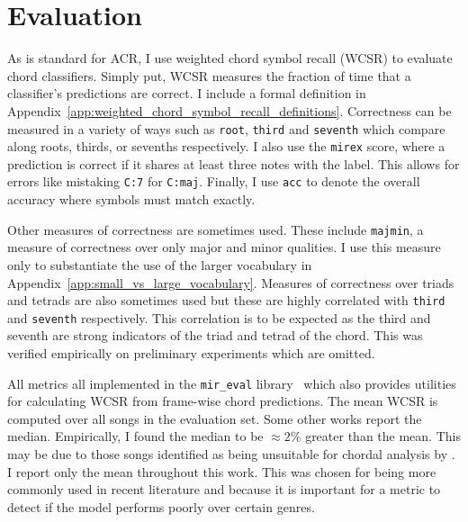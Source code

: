 


\section{Evaluation}\label{sec:evaluation}

As is standard for ACR, I use weighted chord symbol recall (WCSR) to evaluate chord classifiers. Simply put, WCSR measures the fraction of time that a classifier's predictions are correct. I include a formal definition in Appendix~\ref{app:weighted_chord_symbol_recall_definitions}. Correctness can be measured in a variety of ways such as \texttt{root}, \texttt{third} and \texttt{seventh} which compare along roots, thirds, or sevenths respectively. I also use the \texttt{mirex} score, where a prediction is correct if it shares at least three notes with the label. This allows for errors like mistaking \texttt{C:7} for \texttt{C:maj}. Finally, I use \texttt{acc} to denote the overall accuracy where symbols must match exactly.

Other measures of correctness are sometimes used. These include \texttt{majmin}, a measure of correctness over only major and minor qualities. I use this measure only to substantiate the use of the larger vocabulary in Appendix~\ref{app:small_vs_large_vocabulary}. Measures of correctness over triads and tetrads are also sometimes used but these are highly correlated with \texttt{third} and \texttt{seventh} respectively. This correlation is to be expected as the third and seventh are strong indicators of the triad and tetrad of the chord. This was verified empirically on preliminary experiments which are omitted.

All metrics all implemented in the \texttt{mir\_eval} library~\citep{mir_eval} which also provides utilities for calculating WCSR from frame-wise chord predictions. The mean WCSR is computed over all songs in the evaluation set. Some other works report the median. Empirically, I found the median to be $\approx 2\%$ greater than the mean. This may be due to those songs identified as being unsuitable for chordal analysis by \citet{FourTimelyInsights}. I report only the mean throughout this work. This was chosen for being more commonly used in recent literature and because it is important for a metric to detect if the model performs poorly over certain genres.

